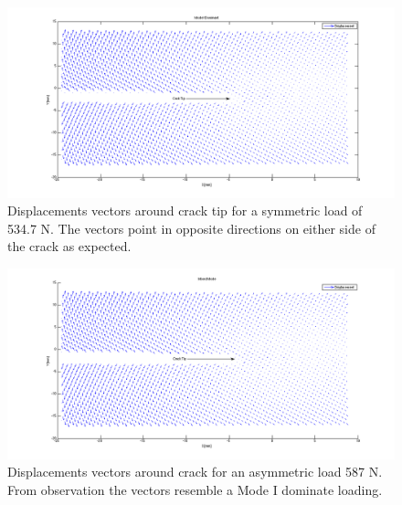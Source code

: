 \documentclass[12pt]{article}
\begin{document}
\begin{figure}[H]
	\centering
	\includegraphics[width=1.0\textwidth,scale=1]{QuiverModeI.png}
	\caption{Displacements vectors around crack tip for a symmetric load of 534.7 N. The vectors point in opposite directions on either side of the crack as expected. }
	\label{fig:Quiver1}
\end{figure}

\begin{figure}[H]
	\centering
	\includegraphics[width=1.0\textwidth, scale=1]{quiverMixedMode.png}
	\caption{Displacements vectors around crack for an asymmetric load 587 N. From observation the vectors resemble a Mode I dominate loading.}
	\label{fig:QuiverMix}
\end{figure}

\newpage
\end{document}

